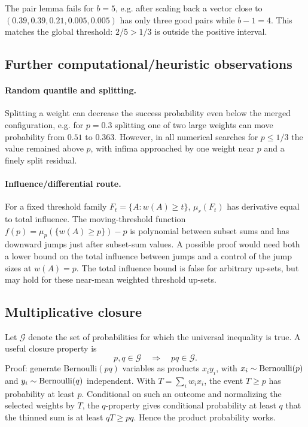 \documentclass[12pt]{article}
\begin{document}
The pair lemma fails for \(b=5\), e.g. after scaling back a vector close to
\((0.39,0.39,0.21,0.005,0.005)\) has only three good pairs while \(b-1=4\).
This matches the global threshold: \(2/5>1/3\) is outside the positive
interval.

\subsection*{Further computational/heuristic observations}

\paragraph{Random quantile and splitting.}
Splitting a weight can decrease the success probability even below the merged
configuration, e.g. for \(p=0.3\) splitting one of two large weights can move
probability from \(0.51\) to \(0.363\).  However, in all numerical searches for
\(p\le1/3\) the value remained above \(p\), with infima approached by one weight
near \(p\) and a finely split residual.

\paragraph{Influence/differential route.}
For a fixed threshold family \(F_t=\{A:w(A)\ge t\}\), \(\mu_r(F_t)\) has
derivative equal to total influence.  The moving-threshold function
\(f(p)=\mu_p(\{w(A)\ge p\})-p\) is polynomial between subset sums and has
downward jumps just after subset-sum values.  A possible proof would need both
a lower bound on the total influence between jumps and a control of the jump
sizes at \(w(A)=p\).  The total influence bound is false for arbitrary up-sets,
but may hold for these near-mean weighted threshold up-sets.


\subsection*{Multiplicative closure}

Let \(\mathcal G\) denote the set of probabilities for which the universal
inequality is true.  A useful closure property is
\[
        p,q\in\mathcal G \quad\Longrightarrow\quad pq\in\mathcal G .
\]
Proof: generate Bernoulli\((pq)\) variables as products \(x_i y_i\), with
\(x_i\sim{\rm Bernoulli}(p)\) and \(y_i\sim{\rm Bernoulli}(q)\) independent.
With \(T=\sum_i w_i x_i\), the event \(T\ge p\) has probability at least \(p\).
Conditional on such an outcome and normalizing the selected weights by \(T\),
the \(q\)-property gives conditional probability at least \(q\) that the thinned
sum is at least \(qT\ge pq\).  Hence the product probability works.
\end{document}
